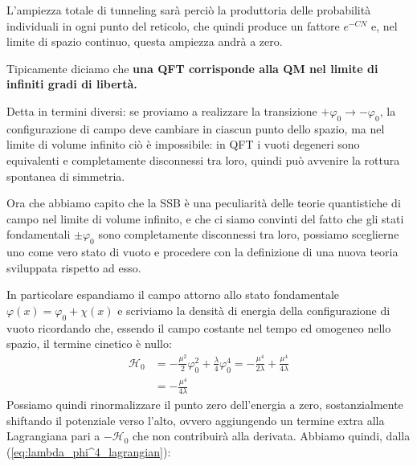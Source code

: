 \documentclass[../main.tex]{subfiles}
\begin{document}
\begin{example}
    L'ampiezza totale di tunneling sarà perciò la produttoria delle probabilità individuali in ogni punto del reticolo, che quindi produce un fattore $e^{-CN}$ e, nel limite di spazio continuo, questa ampiezza andrà a zero. 
    
    Tipicamente diciamo che \textbf{una QFT corrisponde alla QM nel limite di infiniti gradi di libertà.}

    Detta in termini diversi: se proviamo a realizzare la transizione $+\varphi_0\rightarrow-\varphi_0$, la configurazione di campo deve cambiare in ciascun punto dello spazio, ma nel limite di volume infinito ciò è impossibile: in QFT i vuoti degeneri sono equivalenti e completamente disconnessi tra loro, quindi può avvenire la rottura spontanea di simmetria.
\end{example}

Ora che abbiamo capito che la SSB è una peculiarità delle teorie quantistiche di campo nel limite di volume infinito, e che ci siamo convinti del fatto che gli stati fondamentali $\pm\varphi_0$ sono completamente disconnessi tra loro, possiamo sceglierne uno come vero stato di vuoto e procedere con la definizione di una nuova teoria sviluppata rispetto ad esso.

In particolare espandiamo il campo attorno allo stato fondamentale $\boxed{\varphi(x) = \varphi_0 + \chi(x)}$ e scriviamo la densità di energia della configurazione di vuoto ricordando che, essendo il campo costante nel tempo ed omogeneo nello spazio, il termine cinetico è nullo:
\begin{align*}
    \mathscr{H}_0 &= -\frac{\mu^2}{2}\varphi_0^2+\frac{\lambda}{4}\varphi_0^4 = -\frac{\mu^4}{2\lambda}+\frac{\mu^4}{4\lambda}\\
    &=-\frac{\mu^4}{4\lambda}
\end{align*}
Possiamo quindi rinormalizzare il punto zero dell'energia a zero, sostanzialmente shiftando il potenziale verso l'alto, ovvero aggiungendo un termine extra alla Lagrangiana pari a $-\mathscr{H}_0$ che non contribuirà alla derivata. Abbiamo quindi, dalla (\ref{eq:lambda_phi^4_lagrangian}):
\end{document}
